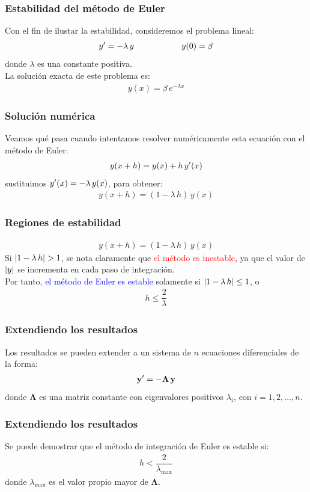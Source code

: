 \documentclass[12pt]{beamer}
\begin{document}
\begin{frame}
\frametitle{Estabilidad del método de Euler}
Con el fin de ilustar la estabilidad, consideremos el problema lineal:
\pause
\begin{align*}
{y}^{\prime} = - \lambda \, y \hspace{2cm} y (0) = \beta
\end{align*}
donde $\lambda$ es una constante positiva.
\\
\medskip
\pause
La solución exacta de este problema es:
\pause
\begin{align*}
y (x) = \beta \, e^{- \lambda x}
\end{align*}
\end{frame}
\begin{frame}
\frametitle{Solución numérica}
Veamos qué pasa cuando intentamos resolver numéricamente esta ecuación con el método de Euler:
\pause
\begin{align*}
y (x + h) = y (x) + h \, {y}^{\prime} (x)
\end{align*}
\pause
sustituimos ${y}^{\prime} (x) = - \lambda \, y (x)$, para obtener:
\pause
\begin{align*}
y (x + h) = (1 - \lambda \, h) \, y (x)
\end{align*}
\end{frame}
\begin{frame}
\frametitle{Regiones de estabilidad}
\begin{align*}
y (x + h) = (1 - \lambda \, h) \, y (x)
\end{align*}
Si $\abs{1 - \lambda \, h} > 1$, se nota claramente que \textcolor{red}{el método es inestable}, \pause ya que el valor de $\abs{y}$ se incrementa en cada paso de integración.
\\
\medskip
\pause
Por tanto, \pause \textcolor{blue}{el método de Euler es estable} solamente si $\abs{1 - \lambda \, h} \leq 1$, o
\begin{align*}
h \leq \dfrac{2}{\lambda}
\end{align*}
\end{frame}
\begin{frame}
\frametitle{Extendiendo los resultados}
Los resultados se pueden extender a un sistema de $n$ ecuaciones diferenciales de la forma:
\pause
\begin{align*}
\mathbf{{y}^{\prime}} = - \mathbf{\Lambda \, y}
\end{align*}
donde $\mathbf{\Lambda}$ es una matriz constante con eigenvalores positivos $\lambda_{i}$, con $i = 1, 2, \ldots, n$.
\end{frame}
\begin{frame}
\frametitle{Extendiendo los resultados}
Se puede demostrar que el método de integración de Euler es estable si:
\pause
\begin{align*}
h < \dfrac{2}{\lambda_{\text{max}}}
\end{align*}
donde $\lambda_{\text{max}}$ es el valor propio mayor de $\mathbf{\Lambda}$.
\end{frame}
\end{document}
